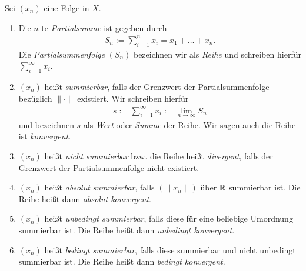 \begin{df}
	Sei $ (x_n) $ eine Folge in $ X $.
	\begin{enumerate}[label = (\roman*).]
		\item Die $ n $-te \textit{Partialsumme} ist gegeben durch
		\begin{align*}
		S_n := \sum \limits_{i=1}^n x_i  = x_1 + \dots + x_n.
		\end{align*}
		Die \textit{Partialsummenfolge} $ (S_n) $ bezeichnen wir als \textit{Reihe} und	schreiben hierfür $ \sum_{i  = 1}^\infty x_i $.
		
		
		\item 
		
		$ (x_n) $ heißt \textit{summierbar}, falls der Grenzwert der Partialsummenfolge bezüglich $ \| \cdot \| $ existiert. Wir schreiben hierfür
		\begin{align*}
		s:= \sum \limits_{i=1}^\infty x_i := \lim \limits_{n \to \infty}  S_n 
		\end{align*}
		und bezeichnen $ s $ als \textit{Wert} oder \textit{Summe} der Reihe.
		Wir sagen auch die Reihe ist \textit{konvergent}.
		
		\item 
		$ (x_n) $ heißt \textit{nicht summierbar} bzw. die Reihe heißt  \textit{divergent}, falls der Grenzwert der Partialsummenfolge nicht existiert. 
		
		\item 
		$ (x_n) $ heißt \textit{absolut summierbar}, falls $ (\| x_n \|) $ über $ \mathbb{R} $ summierbar ist.
		Die Reihe heißt dann \textit{absolut konvergent}. 
		
		
		\item 
		$ (x_n) $ heißt \textit{unbedingt summierbar}, falls diese für eine beliebige Umordnung summierbar ist.
		Die Reihe heißt dann \textit{unbedingt konvergent}. 
		
		\item 
		$ (x_n) $ heißt \textit{bedingt summierbar}, falls diese summierbar und nicht unbedingt summierbar ist.  
		Die Reihe heißt dann \textit{bedingt konvergent}.
	\end{enumerate}
\end{df}

